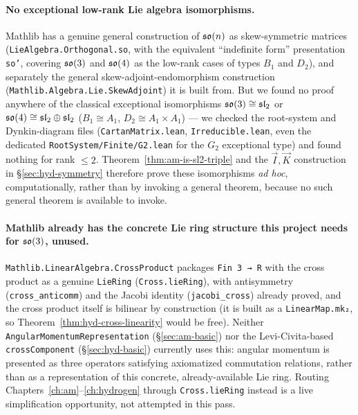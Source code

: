 \paragraph{No exceptional low-rank Lie algebra isomorphisms.} Mathlib has a
genuine general construction of $\mathfrak{so}(n)$ as skew-symmetric matrices
(\texttt{LieAlgebra.Orthogonal.so}, with the equivalent ``indefinite form''
presentation \texttt{so'}, covering $\mathfrak{so}(3)$ and $\mathfrak{so}(4)$ as
the low-rank cases of types $B_1$ and $D_2$), and separately the general
skew-adjoint-endomorphism construction
(\texttt{Mathlib.Algebra.Lie.SkewAdjoint}) it is built from. But we found no
proof anywhere of the classical exceptional isomorphisms
$\mathfrak{so}(3)\cong\mathfrak{sl}_2$ or $\mathfrak{so}(4)\cong\mathfrak{sl}_2\oplus\mathfrak{sl}_2$ ($B_1
\cong A_1$, $D_2\cong A_1\times A_1$) --- we checked the root-system and
Dynkin-diagram files
(\texttt{CartanMatrix.lean}, \texttt{Irreducible.lean}, even the dedicated
\texttt{RootSystem/Finite/G2.lean} for the $G_2$ exceptional type) and found
nothing for rank $\le 2$. Theorem~\ref{thm:am-is-sl2-triple} and the
$\vec I,\vec K$ construction in \S\ref{sec:hyd-symmetry} therefore prove
these isomorphisms \emph{ad hoc}, computationally, rather than by invoking a
general theorem, because no such general theorem is available to invoke.

\paragraph{Mathlib already has the concrete Lie ring structure this project
needs for $\mathfrak{so}(3)$, unused.} \texttt{Mathlib.LinearAlgebra.CrossProduct}
packages \texttt{Fin 3 → R} with the cross product as a genuine
\texttt{LieRing} (\texttt{Cross.lieRing}), with antisymmetry
(\texttt{cross\_anticomm}) and the Jacobi identity (\texttt{jacobi\_cross})
already proved, and the cross product itself is bilinear by construction
(it is built as a \texttt{LinearMap.mk₂}, so
Theorem~\ref{thm:hyd-cross-linearity} would be free). Neither
\texttt{AngularMomentumRepresentation} (\S\ref{sec:am-basic}) nor the
Levi-Civita-based \texttt{crossComponent} (\S\ref{sec:hyd-basic}) currently
uses this: angular momentum is presented as three operators satisfying
axiomatized commutation relations, rather than as a representation of this
concrete, already-available Lie ring. Routing Chapters~\ref{ch:am}--\ref{ch:hydrogen}
through \texttt{Cross.lieRing} instead is a live simplification opportunity,
not attempted in this pass.


